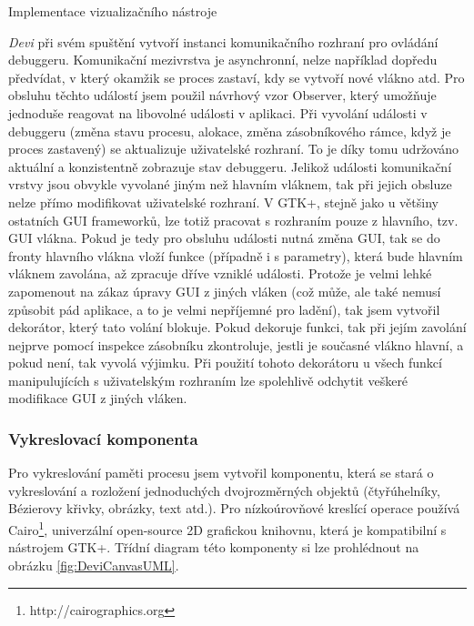 \documentclass[bc,male,python,dept460]{diploma}						%
\newcommand{\parspace}[1][]{
	\ifthenelse{\isempty{#1}}{\vspace{5mm}}{\vspace{#1}}
	\par
}
\begin{document}
\begin{section}{Implementace vizualizačního nástroje}
	\parspace \textit{Devi} při svém spuštění vytvoří instanci komunikačního rozhraní pro ovládání debuggeru. Komunikační mezivrstva je asynchronní,
	nelze například dopředu předvídat, v který okamžik se proces zastaví, kdy se vytvoří nové vlákno atd. Pro obsluhu těchto událostí jsem použil návrhový vzor
	Observer\cite[326]{gof}, který umožňuje jednoduše reagovat na libovolné události v aplikaci. Při vyvolání události v debuggeru (změna stavu procesu,
	alokace, změna zásobníkového rámce, když je proces zastavený) se aktualizuje uživatelské rozhraní. To je díky tomu udržováno aktuální a konzistentně zobrazuje
	stav debuggeru. Jelikož události komunikační vrstvy jsou obvykle vyvolané jiným než hlavním vláknem, tak při jejich obsluze nelze přímo modifikovat uživatelské
	rozhraní. V GTK+, stejně jako u většiny ostatních GUI frameworků, lze totiž pracovat s rozhraním pouze z hlavního, tzv. GUI vlákna. Pokud je tedy pro
	obsluhu události nutná změna GUI, tak se do fronty hlavního vlákna vloží funkce (případně i s parametry), která bude hlavním vláknem zavolána,
	až zpracuje dříve vzniklé události. Protože je velmi lehké zapomenout na zákaz úpravy GUI z jiných vláken (což může, ale také nemusí způsobit pád
	aplikace, a to je velmi nepříjemné pro ladění), tak jsem vytvořil dekorátor, který tato volání blokuje. Pokud dekoruje funkci, tak při jejím zavolání
	nejprve pomocí inspekce zásobníku zkontroluje, jestli je současné vlákno hlavní, a pokud není, tak vyvolá výjimku. Při použití tohoto dekorátoru u všech
	funkcí manipulujících s uživatelským rozhraním lze spolehlivě odchytit veškeré modifikace GUI z jiných vláken.
	
	\subsubsection{Vykreslovací komponenta}
	Pro vykreslování paměti procesu jsem vytvořil komponentu, která se stará o vykreslování a rozložení jednoduchých dvojrozměrných objektů
	(čtyřúhelníky, Bézierovy křivky, obrázky, text atd.). Pro nízkoúrovňové kreslící operace používá Cairo\footnote{http://cairographics.org}, univerzální
	open-source 2D grafickou knihovnu, která je kompatibilní s nástrojem GTK+. Třídní diagram této komponenty si lze prohlédnout na obrázku
	\ref{fig:DeviCanvasUML}.
	
	

\end{section}
\end{document}
